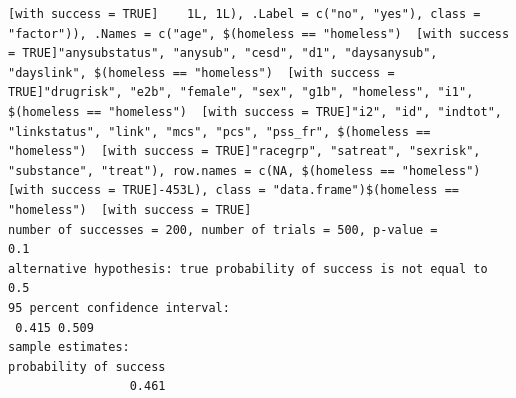\documentclass{tufte-book}\usepackage[]{graphicx}\usepackage[]{xcolor}
\makeatletter
\newenvironment{kframe}{%
 \def\at@end@of@kframe{}%
 \ifinner\ifhmode%
  \def\at@end@of@kframe{\end{minipage}}%
  \begin{minipage}{\columnwidth}%
 \fi\fi%
 \def\FrameCommand##1{\hskip\@totalleftmargin \hskip-\fboxsep
 \colorbox{shadecolor}{##1}\hskip-\fboxsep
     \hskip-\linewidth \hskip-\@totalleftmargin \hskip\columnwidth}%
 \MakeFramed {\advance\hsize-\width
   \@totalleftmargin\z@ \linewidth\hsize
   \@setminipage}}%
 {\par\unskip\endMakeFramed%
 \at@end@of@kframe}
\newenvironment{knitrout}{}{} %
\makeatother
\begin{document}
\begin{knitrout}
\begin{kframe}
\begin{verbatim}
[with success = TRUE]    1L, 1L), .Label = c("no", "yes"), class = "factor")), .Names = c("age", $(homeless == "homeless")  [with success = TRUE]"anysubstatus", "anysub", "cesd", "d1", "daysanysub", "dayslink", $(homeless == "homeless")  [with success = TRUE]"drugrisk", "e2b", "female", "sex", "g1b", "homeless", "i1", $(homeless == "homeless")  [with success = TRUE]"i2", "id", "indtot", "linkstatus", "link", "mcs", "pcs", "pss_fr", $(homeless == "homeless")  [with success = TRUE]"racegrp", "satreat", "sexrisk", "substance", "treat"), row.names = c(NA, $(homeless == "homeless")  [with success = TRUE]-453L), class = "data.frame")$(homeless == "homeless")  [with success = TRUE]
number of successes = 200, number of trials = 500, p-value =
0.1
alternative hypothesis: true probability of success is not equal to 0.5
95 percent confidence interval:
 0.415 0.509
sample estimates:
probability of success 
                 0.461 
\end{verbatim}
\end{kframe}
\end{knitrout}
\end{document}
